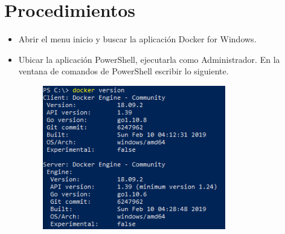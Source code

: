 \section{Procedimientos} 

\begin{itemize}
\subsection{ Iniciando Docker}
	\item Abrir el menu inicio y buscar la aplicación Docker for Windows.

	\item Ubicar la aplicación PowerShell, ejecutarla como Administrador. En la ventana de comandos de PowerShell escribir
lo siguiente.
		\begin{figure}[H]
		\begin{center}
		\includegraphics[width=8cm]{./Imagenes/1}
		\end{center}
		\end{figure}
     

\end{itemize}
